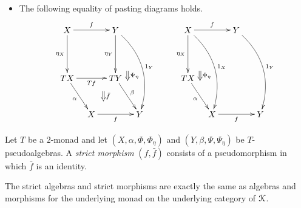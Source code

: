 \begin{Defi}
\begin{itemize}
\[        \endxy
    \]
    \item The following equality of pasting diagrams holds.
            \[
                        \xy
            (0,0)*+{X}="00";
            (20,0)*+{Y}="10";
            (0,-20)*+{TX}="01";
            (20,-20)*+{TY}="11";
            (10,-35)*+{X}="02";
            (30,-35)*+{Y}="12";
            {\ar^{f} "00" ; "10"};
            {\ar@/^1.5pc/^{1_Y} "10" ; "12"};
            {\ar_{\eta_X} "00" ; "01"};
            {\ar_{\eta_Y} "10" ; "11"};
            {\ar_{Tf} "01" ; "11"};
            {\ar_{\alpha} "01" ; "02"};
            {\ar_{f} "02" ; "12"};
            {\ar^{\beta} "11" ; "12"};
            {\ar@{=>}^{\bar{f}} (15,-25.5) ; (15,-29.5)};
            {\ar@{=>}^{\Psi_{\eta}} (25,-17) ; (25,-21)};
            (50,0)*+{X}="30";
            (70,0)*+{Y}="40";
            (50,-20)*+{TX}="31";
            (60,-35)*+{X}="32";
            (80,-35)*+{Y}="42";
            {\ar^{f} "30" ; "40"};
            {\ar_{\eta_X} "30" ; "31"};
            {\ar_{\alpha} "31" ; "32"};
            {\ar_{f} "32" ; "42"};
            {\ar@/^1.5pc/^{1_X} "30" ; "32"};
            {\ar@/^1.5pc/^{1_Y} "40" ; "42"};
            {\ar@{=>}^{\Phi_{\eta}} (55,-17) ; (55,-21)};
        \endxy
        \]
\end{itemize}
\end{Defi}

\begin{Defi}\label{Defi:strictmorphism}
Let $T$ be a $2$-monad and let $(X,\alpha,\Phi,\Phi_\eta)$ and $(Y,\beta,\Psi,\Psi_\eta)$ be $T$-pseudoalgebras. A \textit{strict morphism} $(f, \bar{f})$ consists of a pseudomorphism in which $\bar{f}$ is an identity.
\end{Defi}

\begin{rem}
The strict algebras and strict morphisms are exactly the same as algebras and morphisms for the underlying monad on the underlying category of $\mathcal{K}$.
\end{rem}

